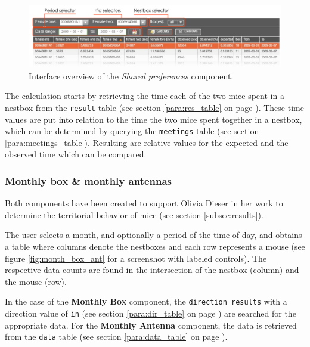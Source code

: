 \begin{figure}[htpb]
\begin{center}
  \includegraphics[width=\textwidth]{assets/pdf/shared_pref.pdf}
  \caption[\textit{Shared preferences} component interface overview]{Interface overview of the \textit{Shared preferences} component.}
  \label{fig:shared_pref}
\end{center}
\end{figure}

The calculation starts by retrieving the time each of the two mice spent in a nestbox from the \lstinline|result| table (see section \ref{para:res_table} on page \pageref{para:res_table}). These time values are put into relation to the time the two mice spent together in a nestbox, which can be determined by querying the \lstinline|meetings| table (see section \ref{para:meetings_table}). Resulting are relative values for the expected and the observed time which can be compared. 

\subsubsection{Monthly box \& monthly antennas}
\label{subsubsec:monthbox}

Both components have been created to support Olivia Dieser in her work to determine the territorial behavior of mice (see section \ref{subsec:results}).

The user selects a month, and optionally a period of the time of day, and obtains a table where columns denote the nestboxes and each row represents a mouse (see figure \ref{fig:month_box_ant} for a screenshot with labeled controls). The respective data counts are found in the intersection of the nestbox (column) and the mouse (row).

In the case of the \textbf{Monthly Box} component, the \lstinline|direction results| with a direction value of \lstinline|in| (see section \ref{para:dir_table} on page \pageref{para:dir_table}) are searched for the appropriate data. For the \textbf{Monthly Antenna} component, the data is retrieved from the \lstinline|data| table (see section \ref{para:data_table} on page \pageref{para:data_table}).

